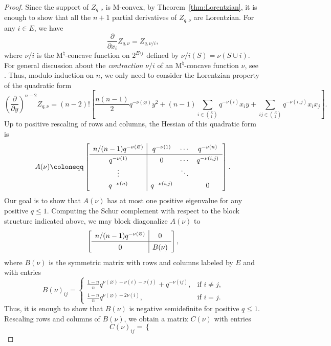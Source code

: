 \documentclass{amsart}
\theoremstyle{definition}
\theoremstyle{remark}
\newcommand{\1}{\mathbf{1}}
\newcommand{\Mnat}{$\text{M}^\natural$}
\numberwithin{equation}{section}
\begin{document}
\begin{proof}
Since the support of $Z_{q,\nu}$ is M-convex, by Theorem~\ref{thm:Lorentzian}, it is enough to 
show that all the $n+1$ partial derivatives of $Z_{q,\nu}$ are Lorentzian.
For any $i \in E$, we have
\[
\frac{\partial}{\partial x_i}Z_{q,\nu}=Z_{q,\nu/i},
\]
where $\nu/i$ is the \Mnat-concave function on $2^{E \setminus i}$ defined by $\nu /i (S)=\nu(S \cup i)$. For general discussion about the \emph{contraction} $\nu /i$ of an \Mnat-concave function $\nu$, see \cite[Section 6.4]{Mu03}. Thus, modulo induction on $n$, we only need to consider the Lorentzian property of the quadratic form
  \[
    \left(\frac{\partial}{\partial y}\right)^{n-2}Z_{q,\nu} 
      =(n-2)!\left[ \frac{n(n-1)}{2} q^{-\nu(\varnothing)} y^2+(n-1)\sum_{i \in \binom{E}{1}}q^{-\nu(i)}
        x_i y+\sum_{ij \in \binom{E}{2}}q^{-\nu(i,j)}x_ix_j \right].
        \]
  Up to positive rescaling of rows and columns, the Hessian of this quadratic form is 
  \[
  A(\nu)\coloneqq \left[
\begingroup
\renewcommand*{\arraystretch}{1.3}
  \begin{array}{c|ccc}
    n/(n-1)q^{-\nu(\varnothing)} & q^{-\nu(1)} & \cdots & q^{-\nu(n)}\\ \hline
    q^{-\nu(1)} & 0 & \cdots & q^{-\nu(i,j)}\\
      \vdots & & \ddots & \\
      q^{-\nu(n)} & q^{-\nu(i,j)} & & 0
  \end{array}
\endgroup
  \right].
  \]
Our goal is to show that $A(\nu)$ has at most one positive eigenvalue for any positive $q \le 1$.
  Computing the Schur complement with respect to the block structure indicated above, we may block diagonalize $A(\nu)$ to
  \[
  \left[
\begingroup
\renewcommand*{\arraystretch}{1.3}
  \begin{array}{c|c}
    n/(n-1)q^{-\nu(\varnothing)} & 0\\ \hline
    0 & B(\nu)\end{array}\endgroup
  \right],
  \]
  where $B(\nu)$ is the symmetric matrix with rows and columns labeled by $E$ and with entries
  \[
  B(\nu)_{ij} = \begin{cases} \frac{1-n}n
    q^{\nu(\varnothing)-\nu(i)-\nu(j)}+q^{-\nu(ij)}, & \text{if $i\neq j$,}\\
    \frac{1-n}nq^{\nu(\varnothing)-2\nu(i)}, & \text{if $i=j$.}
  \end{cases}
  \]
Thus, it is enough to show that $B(\nu)$ is negative semidefinite for positive $q \le 1$. 
  Rescaling rows and columns of $B(\nu)$, we obtain a matrix $C(\nu)$  with entries
  \[
  C(\nu)_{ij} = \begin{cases}

\end{cases}\]
\end{proof}
\end{document}
